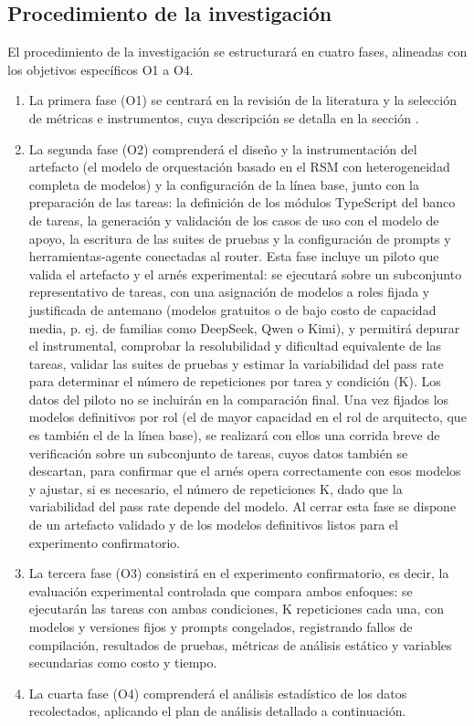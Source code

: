 \subsection{Procedimiento de la investigación}
El procedimiento de la investigación se estructurará en cuatro fases, alineadas con los objetivos específicos O1 a O4.
\begin{enumerate}
  \item La primera fase (O1) se centrará en la revisión de la literatura y la selección de métricas e instrumentos, cuya descripción se detalla en la sección .
  \item La segunda fase (O2) comprenderá el diseño y la instrumentación del artefacto (el modelo de orquestación basado en el RSM con heterogeneidad completa de modelos) y la configuración de la línea base, junto con la preparación de las tareas: la definición de los módulos TypeScript del banco de tareas, la generación y validación de los casos de uso con el modelo de apoyo, la escritura de las suites de pruebas y la configuración de prompts y herramientas-agente conectadas al router. Esta fase incluye un piloto que valida el artefacto y el arnés experimental: se ejecutará sobre un subconjunto representativo de tareas, con una asignación de modelos a roles fijada y justificada de antemano (modelos gratuitos o de bajo costo de capacidad media, p. ej. de familias como DeepSeek, Qwen o Kimi), y permitirá depurar el instrumental, comprobar la resolubilidad y dificultad equivalente de las tareas, validar las suites de pruebas y estimar la variabilidad del pass rate para determinar el número de repeticiones por tarea y condición (K). Los datos del piloto no se incluirán en la comparación final. Una vez fijados los modelos definitivos por rol (el de mayor capacidad en el rol de arquitecto, que es también el de la línea base), se realizará con ellos una corrida breve de verificación sobre un subconjunto de tareas, cuyos datos también se descartan, para confirmar que el arnés opera correctamente con esos modelos y ajustar, si es necesario, el número de repeticiones K, dado que la variabilidad del pass rate depende del modelo. Al cerrar esta fase se dispone de un artefacto validado y de los modelos definitivos listos para el experimento confirmatorio.
  \item La tercera fase (O3) consistirá en el experimento confirmatorio, es decir, la evaluación experimental controlada que compara ambos enfoques: se ejecutarán las tareas con ambas condiciones, K repeticiones cada una, con modelos y versiones fijos y prompts congelados, registrando fallos de compilación, resultados de pruebas, métricas de análisis estático y variables secundarias como costo y tiempo.
  \item La cuarta fase (O4) comprenderá el análisis estadístico de los datos recolectados, aplicando el plan de análisis detallado a continuación.
\end{enumerate}

